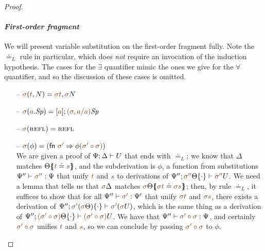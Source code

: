 \begin{proof}
\begin{itemize}
\end{itemize}

\paragraph{\it First-order fragment} We will present variable
substitution on the first-order fragment fully. Note the $\doteq_L$
rule in particular, which does 
{\it not} require an invocation of the induction hypothesis. The cases
for the $\exists$ quantifier mimic the ones we give for the $\forall$
quantifier, and so the discussion of these cases is omitted.

\begin{itemize}

\item[--]
$\lf\sigma(\texistsr{\lf{t}}{N}) = \texistsr{\lf{\sigma t}}{\lf\sigma{N}}$ 

\item[--]
$\lf\sigma(\texistsl{\lf{a}}{\Sp}) = \tforalll{\lf{a}}{\lf{(\sigma, a/a)}\Sp}$ 

\item[--]
$\lf\sigma(\tunifr) = \tunifr$

\item[--]
$\lf\sigma(\phi) = \left( \mathsf{fn}~\lf{\sigma'} \Rightarrow \phi \lf{(\sigma'
  \circ \sigma)}\right)$ \smallskip\\ 
%
  We are given a proof of ${\Psi};{\Delta} \vdash {U} \mathstrut$ that ends with
  ${\doteq}_L$; we know that $\Delta$ matches $\frameoff{\Theta}{\lf{t}
    \doteq \lf{s}}$, and the subderivation is $\phi$, a function from
  substitutions $\Psi'' \vdash \lf{\sigma''} : \Psi$ that unify $\lf{t}$ and $\lf{s}$
  to derivations of
  $\foc{\Psi''}{\tackon{\lf{\sigma''}\Theta}{\cdot}}{\lf{\sigma''}{U}}$. We need
  a lemma that tells us that $\lf\sigma\Delta$ matches
  $\frameoff{\lf\sigma\Theta}{\lf{\sigma t} \doteq \lf{\sigma s}}$; then, by rule
  ${\doteq}_L$, it suffices to show that for all $\Psi'' \vdash
  \lf{\sigma'} : \Psi'$ that unify $\lf{\sigma t}$ and $\lf{\sigma s}$, 
  there exists
  a derivation of $\foc{\Psi''}{\tackon{\lf{\sigma'}(\lf{\sigma}
      \Theta)}{\cdot}}{\lf{\sigma'}(\lf{\sigma} U)}$, which is the same thing as
  a derivation of $\foc{\Psi''}{\tackon{\lf{(\sigma' \circ \sigma)}
      \Theta}{\cdot}} {\lf{(\sigma' \circ \sigma)} U}$. We have that
  $\Psi'' \vdash \lf{\sigma' \circ \sigma} : \Psi$, and certainly $\lf{\sigma'
  \circ \sigma}$ unifies $\lf t$ and $\lf s$, so we can conclude by passing
  $\lf{\sigma' \circ \sigma}$ to $\phi$.\smallskip


\end{itemize}
\end{proof}
